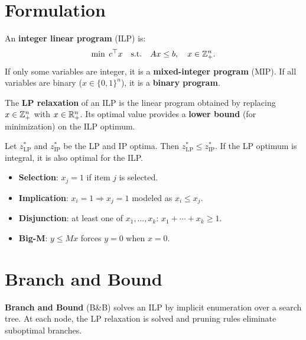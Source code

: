 \section{Formulation}

\begin{definition}
An \textbf{integer linear program} (ILP) is:
\[
  \min\; c^\top x \quad \text{s.t.} \quad Ax \leq b, \quad x \in \mathbb{Z}^n_+.
\]
If only some variables are integer, it is a \textbf{mixed-integer program}
(MIP). If all variables are binary ($x \in \{0,1\}^n$), it is a
\textbf{binary program}.
\end{definition}

\begin{definition}[LP relaxation]
The \textbf{LP relaxation} of an ILP is the linear program obtained by
replacing $x \in \mathbb{Z}^n_+$ with $x \in \mathbb{R}^n_+$. Its optimal value provides a
\textbf{lower bound} (for minimization) on the ILP optimum.
\end{definition}

\begin{proposition}
Let $z^*_{\mathrm{LP}}$ and $z^*_{\mathrm{IP}}$ be the LP and IP optima.
Then $z^*_{\mathrm{LP}} \leq z^*_{\mathrm{IP}}$. If the LP optimum is
integral, it is also optimal for the ILP.
\end{proposition}

\begin{keyformulas}[title=\textbf{Common binary modeling tricks}]
\begin{itemize}
  \item \textbf{Selection}: $x_j = 1$ if item $j$ is selected.
  \item \textbf{Implication}: $x_i = 1 \Rightarrow x_j = 1$ modeled as
        $x_i \leq x_j$.
  \item \textbf{Disjunction}: at least one of $x_1, \ldots, x_k$:
        $x_1 + \cdots + x_k \geq 1$.
  \item \textbf{Big-M}: $y \leq M x$ forces $y = 0$ when $x = 0$.
\end{itemize}
\end{keyformulas}

\section{Branch and Bound}

\begin{definition}
\textbf{Branch and Bound} (B\&B) solves an ILP by implicit enumeration over
a search tree. At each node, the LP relaxation is solved and pruning rules
eliminate suboptimal branches.
\end{definition}

